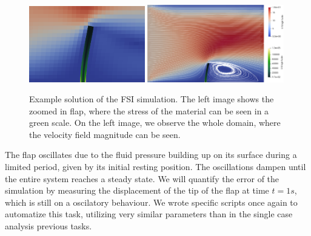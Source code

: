 \documentclass[
  english,        %
  font=times,     %
  onecolumn,      %
]{tumarticle}
\begin{document}
\begin{figure}[!ht]
    \centering
    \includegraphics[width=0.45\textwidth]{resources/FSI_small.png}
    \includegraphics[width=0.53\textwidth]{resources/FSI_big.png}
    \caption{Example solution of the FSI simulation. The left image shows the zoomed in flap, where the stress of the material can be seen in a green scale. On the left image, we observe the whole domain, where the velocity field magnitude can be seen.}
    \label{fig:FSI}
\end{figure}

The flap oscillates due to the fluid pressure building up on its surface during a limited period, given by its initial resting position. The oscillations dampen until the entire system reaches a steady state. We will quantify the error of the simulation by measuring the displacement of the tip of the flap at time $t=1s$, which is still on a oscilatory behaviour. We wrote specific scripts once again to automatize this task, utilizing very similar parameters than in the single case analysis previous tasks. 
\end{document}
